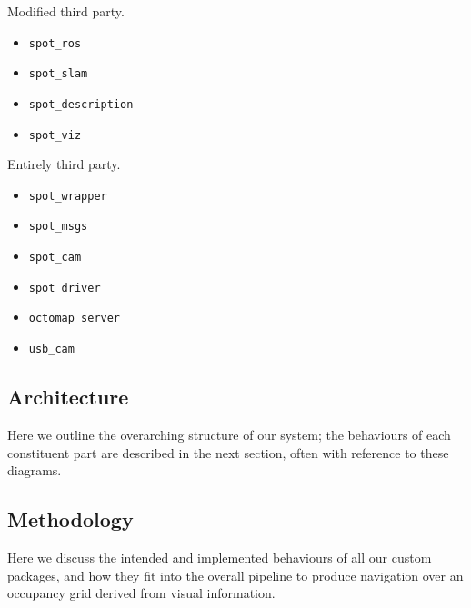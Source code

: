 \documentclass[10pt,english]{article}
\begin{document}
Modified third party.

\begin{itemize}
    \item \texttt{spot\_ros}
    \item \texttt{spot\_slam}
    \item \texttt{spot\_description}
    \item \texttt{spot\_viz}
\end{itemize}

Entirely third party.

\begin{itemize}
    \item \texttt{spot\_wrapper}
    \item \texttt{spot\_msgs}
    \item \texttt{spot\_cam}
    \item \texttt{spot\_driver}
    \item \texttt{octomap\_server}
    \item \texttt{usb\_cam}
\end{itemize}



\clearpage

\subsection*{Architecture}



Here we outline the overarching structure of our system; the behaviours of each constituent part are described in the next section, often with reference to these diagrams.

\clearpage

\subsection*{Methodology}


Here we discuss the intended and implemented behaviours of all our custom packages, and how they fit into the overall pipeline to produce navigation over an occupancy grid derived from visual information.
\end{document}
